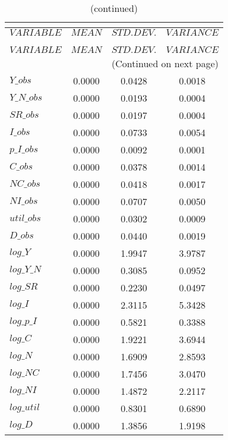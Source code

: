  
\begin{center}
\begin{longtable}{lccc} 
\caption{THEORETICAL MOMENTS}\\
 \label{Table:th_moments}\\
\toprule 
$VARIABLE   $	 & 	 $         MEAN$	 & 	 $    STD. DEV.$	 & 	 $     VARIANCE$\\
\midrule \endfirsthead 
\caption{(continued)}\\
 \toprule \\ 
$VARIABLE   $	 & 	 $         MEAN$	 & 	 $    STD. DEV.$	 & 	 $     VARIANCE$\\
\midrule \endhead 
\midrule \multicolumn{4}{r}{(Continued on next page)} \\ \bottomrule \endfoot 
\bottomrule \endlastfoot 
$Y\_obs     $	 & 	       0.0000	 & 	       0.0428	 & 	       0.0018 \\ 
$Y\_N\_obs  $	 & 	       0.0000	 & 	       0.0193	 & 	       0.0004 \\ 
$SR\_obs    $	 & 	       0.0000	 & 	       0.0197	 & 	       0.0004 \\ 
$I\_obs     $	 & 	       0.0000	 & 	       0.0733	 & 	       0.0054 \\ 
$p\_I\_obs  $	 & 	       0.0000	 & 	       0.0092	 & 	       0.0001 \\ 
$C\_obs     $	 & 	       0.0000	 & 	       0.0378	 & 	       0.0014 \\ 
$NC\_obs    $	 & 	       0.0000	 & 	       0.0418	 & 	       0.0017 \\ 
$NI\_obs    $	 & 	       0.0000	 & 	       0.0707	 & 	       0.0050 \\ 
$util\_obs  $	 & 	       0.0000	 & 	       0.0302	 & 	       0.0009 \\ 
$D\_obs     $	 & 	       0.0000	 & 	       0.0440	 & 	       0.0019 \\ 
$log\_Y     $	 & 	       0.0000	 & 	       1.9947	 & 	       3.9787 \\ 
$log\_Y\_N  $	 & 	       0.0000	 & 	       0.3085	 & 	       0.0952 \\ 
$log\_SR    $	 & 	       0.0000	 & 	       0.2230	 & 	       0.0497 \\ 
$log\_I     $	 & 	       0.0000	 & 	       2.3115	 & 	       5.3428 \\ 
$log\_p\_I  $	 & 	       0.0000	 & 	       0.5821	 & 	       0.3388 \\ 
$log\_C     $	 & 	       0.0000	 & 	       1.9221	 & 	       3.6944 \\ 
$log\_N     $	 & 	       0.0000	 & 	       1.6909	 & 	       2.8593 \\ 
$log\_NC    $	 & 	       0.0000	 & 	       1.7456	 & 	       3.0470 \\ 
$log\_NI    $	 & 	       0.0000	 & 	       1.4872	 & 	       2.2117 \\ 
$log\_util  $	 & 	       0.0000	 & 	       0.8301	 & 	       0.6890 \\ 
$log\_D     $	 & 	       0.0000	 & 	       1.3856	 & 	       1.9198 \\ 
\end{longtable}
 \end{center}
